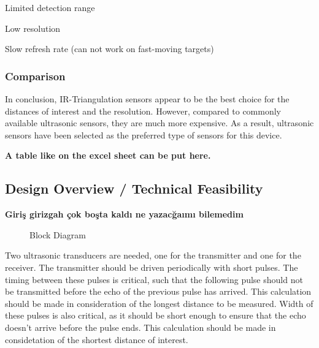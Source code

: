 \documentclass[12pt, a4paper]{article}
\begin{document}
                Limited detection range

                Low resolution 

                Slow refresh rate (can not work on fast-moving targets)


        \subsubsection{Comparison}
            In conclusion, IR-Triangulation sensors appear to be the best choice for the distances of interest and the resolution. However, compared to commonly available ultrasonic sensors, they are much more expensive. As a result, ultrasonic sensors have been selected as the preferred type of sensors for this device.

            \textbf{A table like on the excel sheet can be put here.}


    \pagebreak
    \subsection{Design Overview / Technical Feasibility}
        
        \textbf{Giriş girizgah çok boşta kaldı ne yazacğaımı bilemedim}
        
        \bigskip

        \pagebreak
        \begin{landscape}\centering
            \vspace*{1.8cm}
            \begin{figure}[H]\centering
                \caption{Block Diagram}
            \end{figure}
        \end{landscape}
        \vfill
        \pagebreak

        \bigskip

        Two ultrasonic transducers are needed, one for the transmitter and one for the receiver. The transmitter should be driven periodically with short pulses. The timing between these pulses is critical, such that the following pulse should not be transmitted before the echo of the previous pulse has arrived. This calculation should be made in consideration of the longest distance to be measured. Width of these pulses is also critical, as it should be short enough to ensure that the echo doesn't arrive before the pulse ends. This calculation should be made in considetation of the shortest distance of interest. 
\end{document}
